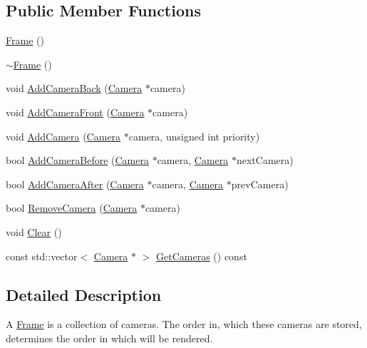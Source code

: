\subsection*{Public Member Functions}
\begin{DoxyCompactItemize}
\item 
\mbox{\hyperlink{classec_1_1_frame_a80ed1da85818f646b6b80fb6c8a6c2a6}{Frame}} ()
\item 
\mbox{\hyperlink{classec_1_1_frame_af2b2c733cacb47d99e460a2b75667eaa}{$\sim$\+Frame}} ()
\item 
void \mbox{\hyperlink{classec_1_1_frame_a06d07d0b719d2941c0334f4b54694348}{Add\+Camera\+Back}} (\mbox{\hyperlink{classec_1_1_camera}{Camera}} $\ast$camera)
\item 
void \mbox{\hyperlink{classec_1_1_frame_a90fb8cd300040ea5884eb0e185385d96}{Add\+Camera\+Front}} (\mbox{\hyperlink{classec_1_1_camera}{Camera}} $\ast$camera)
\item 
void \mbox{\hyperlink{classec_1_1_frame_a038fc1d43f9c11fb6d1c8a7c2127d55f}{Add\+Camera}} (\mbox{\hyperlink{classec_1_1_camera}{Camera}} $\ast$camera, unsigned int priority)
\item 
bool \mbox{\hyperlink{classec_1_1_frame_ae75241fcbc4c499a1ac3a1a084d546ae}{Add\+Camera\+Before}} (\mbox{\hyperlink{classec_1_1_camera}{Camera}} $\ast$camera, \mbox{\hyperlink{classec_1_1_camera}{Camera}} $\ast$next\+Camera)
\item 
bool \mbox{\hyperlink{classec_1_1_frame_aa7cccffd1e0919e75faa35d1f38da5c1}{Add\+Camera\+After}} (\mbox{\hyperlink{classec_1_1_camera}{Camera}} $\ast$camera, \mbox{\hyperlink{classec_1_1_camera}{Camera}} $\ast$prev\+Camera)
\item 
bool \mbox{\hyperlink{classec_1_1_frame_a03d78a820026a27a6f18ec135283e22b}{Remove\+Camera}} (\mbox{\hyperlink{classec_1_1_camera}{Camera}} $\ast$camera)
\item 
void \mbox{\hyperlink{classec_1_1_frame_a9756a68f9db16a43cf23dac3f13c0672}{Clear}} ()
\item 
const std\+::vector$<$ \mbox{\hyperlink{classec_1_1_camera}{Camera}} $\ast$ $>$ \mbox{\hyperlink{classec_1_1_frame_ab0a5922f4be8a3565617418f447d4a5e}{Get\+Cameras}} () const
\end{DoxyCompactItemize}


\subsection{Detailed Description}
A \mbox{\hyperlink{classec_1_1_frame}{Frame}} is a collection of cameras. The order in, which these cameras are stored, determines the order in which will be rendered. 

